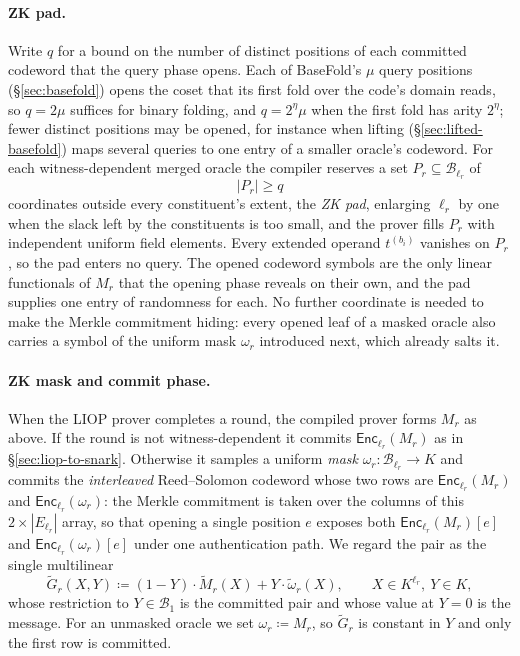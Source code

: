 \documentclass{article}
\theoremstyle{definition}
\newcommand*{\mle}{\widetilde}
\newcommand{\BB}{\mathcal{B}}
\begin{document}
\paragraph{ZK pad.}
Write $q$ for a bound on the number of distinct positions of each committed codeword that the query phase opens. Each of BaseFold's $\mu$ query positions (\S\ref{sec:basefold}) opens the coset that its first fold over the code's domain reads, so $q = 2\mu$ suffices for binary folding, and $q = 2^\eta \mu$ when the first fold has arity $2^\eta$; fewer distinct positions may be opened, for instance when lifting (\S\ref{sec:lifted-basefold}) maps several queries to one entry of a smaller oracle's codeword. For each witness-dependent merged oracle the compiler reserves a set $P_r \subseteq \BB_{\ell_r}$ of
\[
  |P_r| \ge q
\]
coordinates outside every constituent's extent, the \emph{ZK pad}, enlarging $\ell_r$ by one when the slack left by the constituents is too small, and the prover fills $P_r$ with independent uniform field elements. Every extended operand $t^{(b_i)}$ vanishes on $P_r$, so the pad enters no query. The opened codeword symbols are the only linear functionals of $M_r$ that the opening phase reveals on their own, and the pad supplies one entry of randomness for each. No further coordinate is needed to make the Merkle commitment hiding: every opened leaf of a masked oracle also carries a symbol of the uniform mask $\omega_r$ introduced next, which already salts it.

\paragraph{ZK mask and commit phase.}
When the LIOP prover completes a round, the compiled prover forms $M_r$ as above. If the round is not witness-dependent it commits $\textsf{Enc}_{\ell_r}(M_r)$ as in \S\ref{sec:liop-to-snark}. Otherwise it samples a uniform \emph{mask} $\omega_r \colon \BB_{\ell_r} \to K$ and commits the \emph{interleaved} Reed--Solomon codeword whose two rows are $\textsf{Enc}_{\ell_r}(M_r)$ and $\textsf{Enc}_{\ell_r}(\omega_r)$: the Merkle commitment is taken over the columns of this $2 \times |E_{\ell_r}|$ array, so that opening a single position $e$ exposes both $\textsf{Enc}_{\ell_r}(M_r)[e]$ and $\textsf{Enc}_{\ell_r}(\omega_r)[e]$ under one authentication path. We regard the pair as the single multilinear
\[
  \mle{G}_r(X, Y) \coloneqq (1 - Y) \cdot \mle{M}_r(X) + Y \cdot \mle{\omega}_r(X), \qquad X \in K^{\ell_r},\ Y \in K,
\]
whose restriction to $Y \in \BB_1$ is the committed pair and whose value at $Y = 0$ is the message. For an unmasked oracle we set $\omega_r \coloneqq M_r$, so $\mle{G}_r$ is constant in $Y$ and only the first row is committed.
\end{document}
